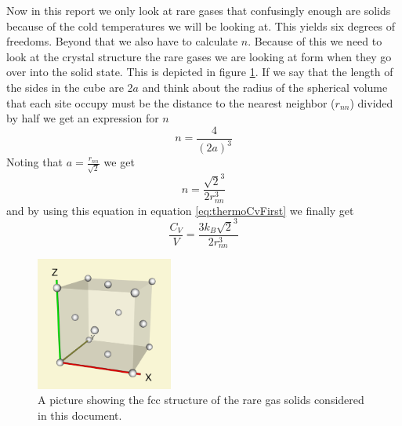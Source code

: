 \documentclass[11pt]{article}
\begin{document}
Now in this report we only look at rare gases that confusingly enough are solids because of the cold temperatures we will be looking at. This yields six degrees of freedoms. Beyond that we also have to calculate $n$. Because of this we need to look at the crystal structure the rare gases we are looking at form when they go over into the solid state. This is depicted in figure \ref{fig:fcc}. If we say that the length of the sides in the cube are 2$a$  and think about the radius of the spherical volume that each site occupy must be the distance to the nearest neighbor ($r_{nn}$) divided by half we get an expression for $n$
\begin{equation}
	n = \frac{4}{(2a)^3}
\end{equation}
Noting that $a = \frac{r_{nn}}{\sqrt{2}}$ we get
\begin{equation}
	n = \frac{\sqrt{2}^3}{2r_{nn}^3}
	\label{eq:n}
\end{equation}
and by using this equation in equation \ref{eq:thermoCvFirst} we finally get 
\begin{equation}
	\frac{C_V}{V} = \frac{3k_B\sqrt{2}^3}{2r_{nn}^3}
	\label{eq:thermoCv}
\end{equation}

\begin{figure}[H]
	\centering
	\includegraphics[width=0.4\textwidth]{fcc.png}
	\caption{A picture showing the fcc structure of the rare gas solids considered in this document.}
	\label{fig:fcc}
\end{figure}
\end{document}

